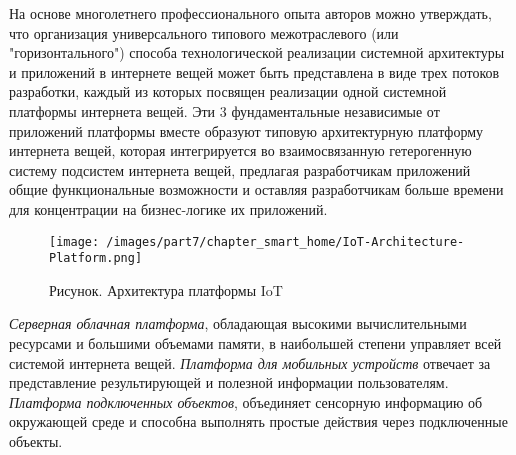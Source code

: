 \begin{SCn}
\end{SCn}

На основе многолетнего профессионального опыта авторов можно утверждать, что организация универсального типового межотраслевого (или "горизонтального"{}) способа технологической реализации системной архитектуры и приложений в интернете вещей может быть представлена в виде трех потоков разработки, каждый из которых посвящен реализации одной системной платформы интернета вещей. Эти 3 фундаментальные независимые от приложений платформы вместе образуют типовую архитектурную платформу интернета вещей, которая интегрируется во взаимосвязанную гетерогенную систему подсистем интернета вещей, предлагая разработчикам приложений общие функциональные возможности  и оставляя разработчикам больше времени для концентрации на бизнес-логике их приложений.

\begin{figure}[H]
	\texttt{[image: /images/part7/chapter\_smart\_home/IoT-Architecture-Platform.png]}
	\caption{Рисунок. Архитектура платформы IoT}
	\label{fig:iot}
\end{figure}

\textit{Серверная облачная платформа}, обладающая высокими вычислительными ресурсами и большими объемами памяти, в наибольшей степени управляет всей системой интернета вещей. \textit{Платформа для мобильных устройств} отвечает за представление результирующей и полезной информации пользователям. \textit{Платформа подключенных объектов}, объединяет сенсорную информацию об окружающей среде и способна выполнять простые действия через подключенные объекты.

